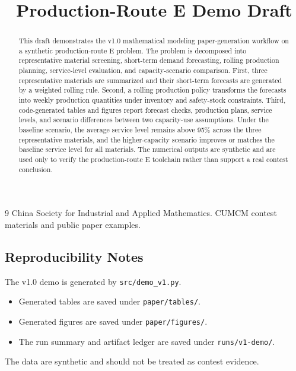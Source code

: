 \documentclass[withoutpreface]{cumcmthesis}
\title{Production-Route E Demo Draft}
\begin{document}
\maketitle

\begin{abstract}
This draft demonstrates the v1.0 mathematical modeling paper-generation workflow on a synthetic production-route E problem. The problem is decomposed into representative material screening, short-term demand forecasting, rolling production planning, service-level evaluation, and capacity-scenario comparison. First, three representative materials are summarized and their short-term forecasts are generated by a weighted rolling rule. Second, a rolling production policy transforms the forecasts into weekly production quantities under inventory and safety-stock constraints. Third, code-generated tables and figures report forecast checks, production plans, service levels, and scenario differences between two capacity-use assumptions. Under the baseline scenario, the average service level remains above 95\% across the three representative materials, and the higher-capacity scenario improves or matches the baseline service level for all materials. The numerical outputs are synthetic and are used only to verify the production-route E toolchain rather than support a real contest conclusion.

\end{abstract}













\begin{thebibliography}{9}
China Society for Industrial and Applied Mathematics. CUMCM contest materials and public paper examples.
\end{thebibliography}

\begin{appendices}
\section{Reproducibility Notes}
The v1.0 demo is generated by \texttt{src/demo\_v1.py}.
\begin{itemize}
  \item Generated tables are saved under \texttt{paper/tables/}.
  \item Generated figures are saved under \texttt{paper/figures/}.
  \item The run summary and artifact ledger are saved under \texttt{runs/v1-demo/}.
\end{itemize}
The data are synthetic and should not be treated as contest evidence.
\end{appendices}
\end{document}
